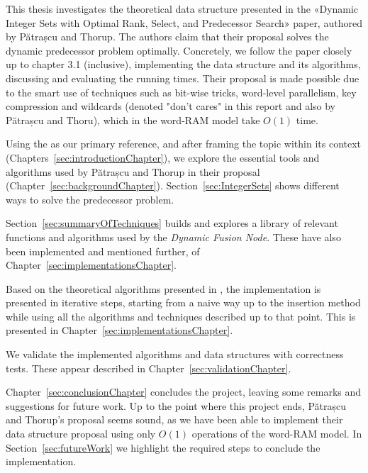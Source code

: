 
This thesis investigates the theoretical data structure presented in the «Dynamic Integer Sets with Optimal Rank, Select, and Predecessor Search» paper, authored by Pătrașcu and Thorup.
The authors claim that their proposal solves the dynamic predecessor problem optimally. Concretely, we follow the paper closely up to chapter 3.1 (inclusive), implementing the data structure and its algorithms, discussing and evaluating the running times.
Their proposal is made possible due to the smart use of techniques such as bit-wise tricks, word-level parallelism, key compression and wildcards (denoted "don't cares" in this report and also by Pătrașcu and Thoru), which in the word-RAM model take $O(1)$ time.

Using the \cite{patrascu2014dynamic} as our primary reference, and after framing the topic within its context (Chapters~\ref{sec:introductionChapter}), we explore the essential tools and algorithms used by Pătrașcu and Thorup in their proposal (Chapter~\ref{sec:backgroundChapter}).
Section~\ref{sec:IntegerSets} shows different ways to solve the predecessor problem.

Section~\ref{sec:summaryOfTechniques} builds and explores a library of relevant functions and algorithms used by the \textit{Dynamic Fusion Node}. These have also been implemented and mentioned further, of Chapter~\ref{sec:implementationsChapter}.

Based on the theoretical algorithms presented in \cite{patrascu2014dynamic}, the implementation is presented in iterative steps, starting from a naive way up to the insertion method while using all the algorithms and techniques described up to that point. This is presented in Chapter~\ref{sec:implementationsChapter}.

We validate the implemented algorithms and data structures with correctness tests. These appear described in Chapter~\ref{sec:validationChapter}.

Chapter~\ref{sec:conclusionChapter} concludes the project, leaving some remarks and suggestions for future work.
Up to the point where this project ends, Pătrașcu and Thorup's proposal seems sound, as we have been able to implement their data structure proposal using only $O(1)$ operations of the word-RAM model. In Section~\ref{sec:futureWork} we highlight the required steps to conclude the implementation.

